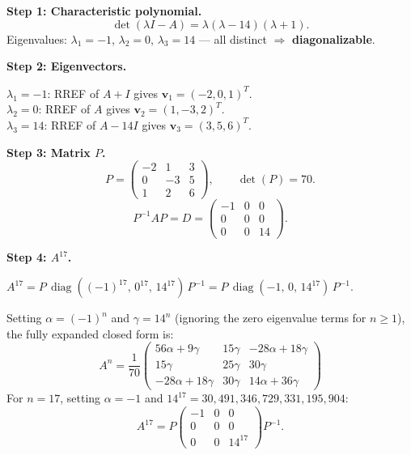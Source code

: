 \documentclass[12pt,a3paper]{article}
\begin{document}
\begin{tcolorbox}[enhanced,breakable,
  colback=cE!4,colframe=cE,boxrule=0.8pt,arc=5pt,
  title={\textbf{Answer --- Diagonalizability \& $A^{17}$ for
    $A=\begin{pmatrix}1&3&4\\3&5&6\\4&6&7\end{pmatrix}$}},
  fonttitle=\bfseries\color{white},colbacktitle=cE]

\textbf{Step 1: Characteristic polynomial.}
\[
  \det(\lambda I-A)=\lambda(\lambda-14)(\lambda+1).
\]
Eigenvalues: $\lambda_1=-1$, $\lambda_2=0$, $\lambda_3=14$ — all distinct $\Rightarrow$ \textbf{diagonalizable}.

\textbf{Step 2: Eigenvectors.}

$\lambda_1=-1$: RREF of $A+I$ gives $\mathbf{v}_1=(-2,0,1)^T$.\\
$\lambda_2=0$: RREF of $A$ gives $\mathbf{v}_2=(1,-3,2)^T$.\\
$\lambda_3=14$: RREF of $A-14I$ gives $\mathbf{v}_3=(3,5,6)^T$.

\textbf{Step 3: Matrix $P$.}
\[
  P=\begin{pmatrix}-2&1&3\\0&-3&5\\1&2&6\end{pmatrix},\qquad \det(P)=70.
\]
\[
  P^{-1}AP=D=\begin{pmatrix}-1&0&0\\0&0&0\\0&0&14\end{pmatrix}.
\]

\textbf{Step 4: $A^{17}$.}

$A^{17}=P\,\operatorname{diag}((-1)^{17},\,0^{17},\,14^{17})\,P^{-1}=P\,\operatorname{diag}(-1,\,0,\,14^{17})\,P^{-1}$.

Setting $\alpha=(-1)^n$ and $\gamma=14^n$ (ignoring the zero eigenvalue terms for $n\geq1$), the fully expanded closed form is:
\[
  A^n=\frac{1}{70}\begin{pmatrix}
    56\alpha + 9\gamma & 15\gamma & -28\alpha + 18\gamma \\[4pt]
    15\gamma & 25\gamma & 30\gamma \\[4pt]
    -28\alpha + 18\gamma & 30\gamma & 14\alpha + 36\gamma
  \end{pmatrix}
\]
For $n=17$, setting $\alpha=-1$ and $14^{17}=30{,}491{,}346{,}729{,}331{,}195{,}904$:
\[
  \boxed{A^{17}=P\begin{pmatrix}-1&0&0\\0&0&0\\0&0&14^{17}\end{pmatrix}P^{-1}.}
\]

\end{tcolorbox}
\end{document}
